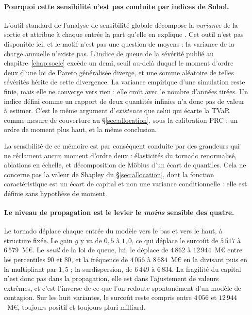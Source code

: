 \paragraph{Pourquoi cette sensibilité n'est pas conduite par indices de Sobol.} L'outil
standard de l'analyse de sensibilité globale décompose la \emph{variance} de la sortie et
attribue à chaque entrée la part qu'elle en explique \citep{Owen2014, IoossPrieur2019}. Cet
outil n'est pas disponible ici, et le motif n'est pas une question de moyens : la
variance de la charge annuelle n'existe pas. L'indice de queue de la sévérité publié au
chapitre~\ref{chap:socle} excède un demi, seuil au-delà duquel le moment d'ordre deux d'une
loi de Pareto généralisée diverge, et une somme aléatoire de telles sévérités hérite de cette
divergence. La variance empirique d'une simulation reste finie, mais elle ne converge vers
rien : elle croît avec le nombre d'années tirées. Un indice défini comme un rapport de deux
quantités infinies n'a donc pas de valeur à estimer. C'est le même argument d'\emph{existence}
que celui qui écarte la TVaR comme mesure de couverture au \S\ref{sec:allocation}, sous la
calibration PRC : un ordre de moment plus haut, et la même conclusion.

La sensibilité de ce mémoire est par conséquent conduite par des grandeurs qui ne réclament
aucun moment d'ordre deux : élasticités du tornado renormalisé, ablations en échelle, et
décomposition de Möbius d'un écart de quantiles. Cela ne concerne pas la valeur de
Shapley du \S\ref{sec:allocation}, dont la fonction caractéristique est un écart de capital et
non une variance conditionnelle : elle est définie sans hypothèse de moment.

\paragraph{Le niveau de propagation est le levier le \emph{moins} sensible des quatre.} Le
tornado déplace chaque entrée du modèle vers le bas et vers le haut, à structure fixée. Le gain
$g$ y va de $0{,}5$ à $1{,}0$, ce qui déplace le surcoût de $5\,517$ à $6\,579$~M\euro. Le
\emph{seuil} de la loi de queue, lui, le déplace de $4\,862$ à $12\,944$~M\euro{} entre les
percentiles $90$ et $80$, et la fréquence de $4\,056$ à $8\,684$~M\euro{} en la divisant puis en
la multipliant par $1{,}5$ ; la surdispersion, de $6\,449$ à $6\,834$. La fragilité du
capital n'est donc pas dans la propagation, elle est dans l'ajustement de valeurs extrêmes,
et c'est l'inverse de ce que l'on redoute spontanément d'un modèle de contagion. Sur les huit
variantes, le surcoût reste compris entre $4\,056$ et $12\,944$~M\euro, toujours positif et
toujours pluri-milliard.

